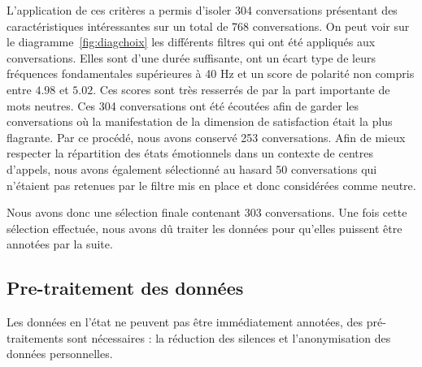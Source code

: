 L'application de ces critères a permis d'isoler 304 conversations présentant des caractéristiques intéressantes sur un total de 768 conversations. On peut voir sur le diagramme~\ref{fig:diagchoix} les différents filtres qui ont été appliqués aux conversations. Elles sont d'une durée suffisante, ont un écart type de leurs fréquences fondamentales supérieures à 40 Hz et un score de polarité non compris entre $4.98$ et $5.02$. Ces scores sont très resserrés de par la part importante de mots neutres. Ces 304 conversations ont été écoutées afin de garder les conversations où la manifestation de la dimension de satisfaction était la plus flagrante. Par ce procédé, nous avons conservé 253 conversations.
Afin de mieux respecter la répartition des états émotionnels dans un contexte de centres d'appels, nous avons également sélectionné au hasard 50 conversations qui n'étaient pas retenues par le filtre mis en place et donc considérées comme neutre.

Nous avons donc une sélection finale contenant 303 conversations.
Une fois cette sélection effectuée, nous avons dû traiter les données pour qu'elles puissent être annotées par la suite.

\subsection{Pre-traitement des données}
Les données en l'état ne peuvent pas être immédiatement annotées, des pré-traitements sont nécessaires : la réduction des silences et l'anonymisation des données personnelles.

